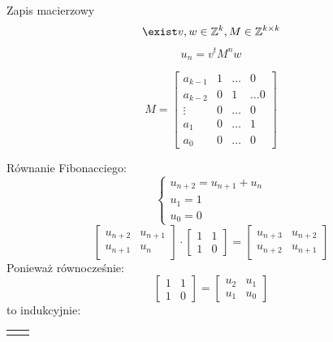 \documentclass[handout]{beamer}
\theoremstyle{definition}
\theoremstyle{named}
\begin{document}
\begin{frame}{Zapis macierzowy}
    $$\exist v, w \in \mathbb{Z}^{k}, M \in \mathbb{Z}^{k\times k} $$
    $$u_n = v^{t}M^{n}w$$

    $$
    M = \begin{bmatrix}
    a_{k-1} & 1 &  \ldots & 0 \\
    a_{k-2} & 0 & 1 & \ldots 0  \\
    \vdots & 0 & \ldots & 0 \\ 
    a_1 & 0 & \ldots & 1 \\
    a_0 & 0 & \ldots & 0
    \end{bmatrix}
    $$
\end{frame}

\begin{frame}{Równanie Fibonacciego:}
\begin{equation*}
\begin{cases}
u_{n+2} = u_{n+1} + u_n \\
u_{1} = 1 \\
u_{0} = 0 
\end{cases}
\end{equation*}
\begin{equation*}
        \begin{bmatrix}
        u_{n+2} & u_{n+1} \\
        u_{n+1} & u_{n} 
        \end{bmatrix} 
        \cdot
        \begin{bmatrix}
        1 & 1\\
        1 & 0
        \end{bmatrix}
        = 
        \begin{bmatrix}
        u_{n+3} & u_{n+2}\\
        u_{n+2} & u_{n+1}
        \end{bmatrix}
\end{equation*}
Ponieważ równocześnie:
\begin{equation*}
    \begin{bmatrix}
    1 & 1 \\
    1 & 0 
    \end{bmatrix}= 
    \begin{bmatrix}
    u_2 & u_1 \\
    u_1 & u_0
    
    \end{bmatrix}
\end{equation*}
to indukcyjnie: 
\begin{table}[]
    \centering
    \begin{tabular}{c|c}
       \begin{equation*}
    

\end{equation*}
\end{tabular}
\end{table}
\end{frame}
\end{document}
